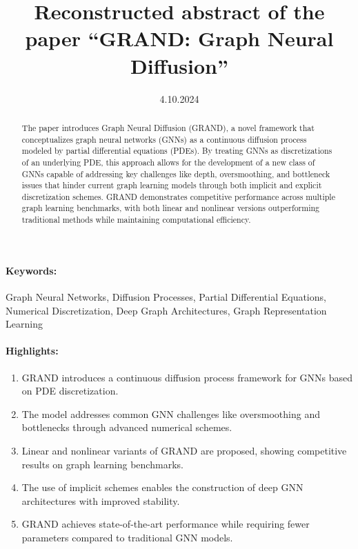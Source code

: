 \documentclass[12pt]{article}
\title{Reconstructed abstract of the paper ``GRAND: Graph Neural Diffusion''}
\date{4.10.2024}
\begin{document}
\maketitle

\begin{abstract}
The paper introduces Graph Neural Diffusion (GRAND), a novel framework that conceptualizes graph neural networks (GNNs) as a continuous diffusion process modeled by partial differential equations (PDEs). By treating GNNs as discretizations of an underlying PDE, this approach allows for the development of a new class of GNNs capable of addressing key challenges like depth, oversmoothing, and bottleneck issues that hinder current graph learning models through both implicit and explicit discretization schemes. GRAND demonstrates competitive performance across multiple graph learning benchmarks, with both linear and nonlinear versions outperforming traditional methods while maintaining computational efficiency.
\end{abstract}
\paragraph{Keywords:} Graph Neural Networks, Diffusion Processes, Partial Differential Equations, Numerical Discretization,  Deep Graph Architectures, Graph Representation Learning

\paragraph{Highlights:}
\begin{enumerate}
\item GRAND introduces a continuous diffusion process framework for GNNs based on PDE discretization.
\item The model addresses common GNN challenges like oversmoothing and bottlenecks through advanced numerical schemes.
\item Linear and nonlinear variants of GRAND are proposed, showing competitive results on graph learning benchmarks.
\item The use of implicit schemes enables the construction of deep GNN architectures with improved stability.
\item GRAND achieves state-of-the-art performance while requiring fewer parameters compared to traditional GNN models.
\end{enumerate}
\end{document}
